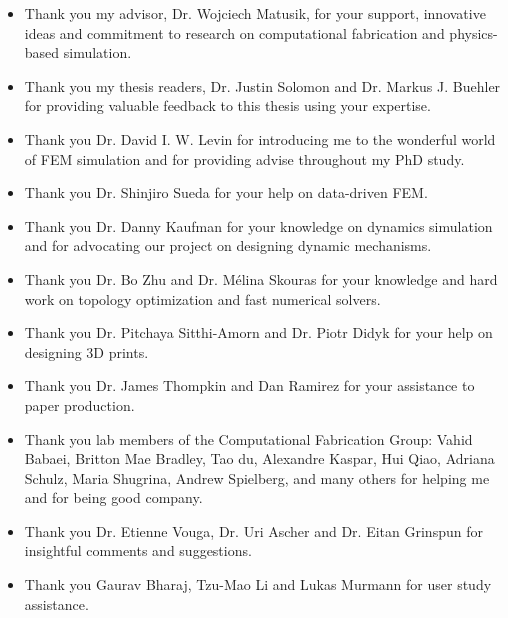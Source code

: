 \begin{itemize}
\item[]
Thank you my advisor, Dr. Wojciech Matusik, for your support, innovative ideas and commitment to research on computational fabrication and physics-based simulation.
\item[]
Thank you my thesis readers, Dr. Justin Solomon and Dr. Markus J. Buehler for providing valuable feedback to this thesis using your expertise.
\item[]
Thank you Dr. David I. W. Levin for introducing me to the wonderful world of FEM simulation and for providing advise throughout my PhD study.
\item[]
Thank you Dr. Shinjiro Sueda for your help on data-driven FEM.
\item[]
Thank you Dr. Danny Kaufman for your knowledge on dynamics simulation and for advocating our project on designing dynamic mechanisms.
\item[]
Thank you Dr. Bo Zhu and Dr. M\'{e}lina Skouras for your knowledge and hard work on topology optimization and fast numerical solvers.
\item[]
Thank you Dr. Pitchaya Sitthi-Amorn and Dr. Piotr Didyk for your help on designing 3D prints.
\item[]
Thank you Dr. James Thompkin and Dan Ramirez for your assistance to paper production.
\item[]
Thank you lab members of the Computational Fabrication Group: Vahid Babaei, Britton Mae Bradley, Tao du, Alexandre Kaspar, Hui Qiao, Adriana 
Schulz, Maria Shugrina, Andrew Spielberg, and many others for helping me and for being good company.
\item[]
Thank you Dr. Etienne Vouga, Dr. Uri Ascher and Dr. Eitan Grinspun for insightful comments and suggestions.
\item[]
Thank you Gaurav Bharaj, Tzu-Mao Li and Lukas Murmann for user study assistance.
\end{itemize}
